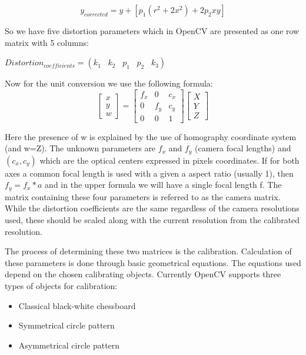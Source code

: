 \documentclass[11pt]{report}
\begin{document}
\begin{equation}
y_{corrected} = y + [p_{1}(r^{2} + 2x^{2}) + 2p_{2}xy] 
\end{equation}

So we have five distortion parameters which in OpenCV are presented as one row matrix with 5 columns:

$Distortion_{coefficients}=(k_1 \hspace{10pt} k_2 \hspace{10pt} p_1 \hspace{10pt} p_2 \hspace{10pt} k_3)$

Now for the unit conversion we use the following formula:
\begin{equation}
\begin{bmatrix}
x \\ y \\w
\end{bmatrix}=
\begin{bmatrix}
f_x & 0 & c_x\\
0 & f_y & c_y\\
0 & 0 & 1
\end{bmatrix}
\begin{bmatrix}
X \\ Y \\ Z
\end{bmatrix}
\end{equation}


Here the presence of w is explained by the use of homography coordinate system (and w=Z). The unknown parameters are $f_x$ and $f_y$ (camera focal lengths) and $(c_x, c_y)$ which are the optical centers expressed in pixels coordinates. If for both axes a common focal length is used with a given a aspect ratio (usually 1), then $f_y=f_x*a$ and in the upper formula we will have a single focal length f. The matrix containing these four parameters is referred to as the camera matrix. While the distortion coefficients are the same regardless of the camera resolutions used, these should be scaled along with the current resolution from the calibrated resolution.

The process of determining these two matrices is the calibration. Calculation of these parameters is done through basic geometrical equations. The equations used depend on the chosen calibrating objects. Currently OpenCV supports three types of objects for calibration:

\begin{itemize}
 \item Classical black-white chessboard
 \item Symmetrical circle pattern
 \item Asymmetrical circle pattern
\end{itemize}
\end{document}
